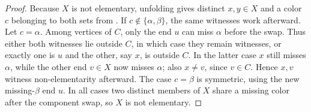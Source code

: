 \begin{proof}
Because \(X\) is not elementary, unfolding
 gives distinct \(x,y\in X\) and a
color \(c\) belonging to both sets from .  If
\(c\notin\{\alpha,\beta\}\), the same witnesses work afterward.  Let
\(c=\alpha\).  Among vertices of \(C\), only the end \(u\) can miss
\(\alpha\) before the swap.  Thus either both witnesses lie outside
\(C\), in which case they remain witnesses, or exactly one is \(u\)
and the other, say \(x\), is outside \(C\).  In the latter case \(x\)
still misses \(\alpha\), while the other end \(v\in X\) now misses
\(\alpha\); also \(x\ne v\), since \(v\in C\).  Hence \(x,v\) witness
non-elementarity afterward.  The case \(c=\beta\) is symmetric, using
the new missing-\(\beta\) end \(u\).  In all cases two distinct members
of \(X\) share a missing color after the component swap, so \(X\) is
not elementary.
\end{proof}
